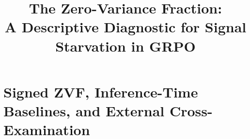 \documentclass{article}
\title{The Zero-Variance Fraction:\\
       A Descriptive Diagnostic for Signal Starvation in GRPO}
\begin{document}
\sloppy {}  \hfuzz=2pt
\maketitle









\section{Signed ZVF, Inference-Time Baselines, and External Cross-Examination}
\label{sec:p2-further}




\appendix






\end{document}
